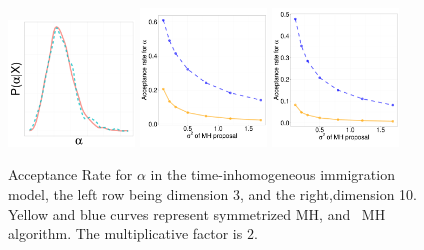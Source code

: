   \begin{figure}[H]
  \centering

  \begin{minipage}[!hp]{0.99\linewidth}
    \includegraphics [width=0.3\textwidth, angle=0]{figs/QC_ks/qc_hist_4_03_10_.pdf}
    \includegraphics [width=0.30\textwidth, angle=0]{figs/acc/CQ_D3alpha_k2.pdf}
	\hspace{.5in}
    \includegraphics [width=0.30\textwidth, angle=0]{figs/acc/CQ_D10alpha_k2.pdf}
  \end{minipage}
    \caption{Acceptance Rate for $\alpha$ in the time-inhomogeneous immigration model, the left row being dimension 3, and the right,dimension 10.  Yellow and blue curves represent symmetrized MH,
 and \naive\ MH  algorithm. The multiplicative factor is $2$. }
     \label{fig:ACC_CQ}
  \end{figure}

